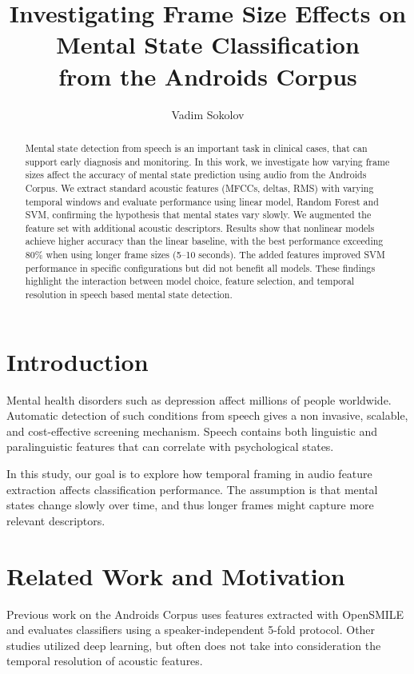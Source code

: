 \documentclass[conference]{IEEEtran}
\begin{document}
\title{\textbf{Investigating Frame Size Effects on Mental State Classification\\ from the Androids Corpus}}


\author{Vadim Sokolov}
\date{}

\maketitle

\begin{abstract}
Mental state detection from speech is an important task in clinical cases, that can support early diagnosis and monitoring. 
In this work, we investigate how varying frame sizes affect the accuracy of mental state prediction using audio from the Androids Corpus. 
We extract standard acoustic features (MFCCs, deltas, RMS) with varying temporal windows and evaluate performance using linear model, Random Forest and SVM, confirming the hypothesis that mental states vary slowly. 
We augmented the feature set with additional acoustic descriptors. 
Results show that nonlinear models achieve higher accuracy than the linear baseline, with the best performance exceeding 80\% when using longer frame sizes (5–10 seconds). 
The added features improved SVM performance in specific configurations but did not benefit all models. 
These findings highlight the interaction between model choice, feature selection, and temporal resolution in speech based mental state detection.

\end{abstract}

\section{Introduction}
Mental health disorders such as depression affect millions of people worldwide. 
Automatic detection of such conditions from speech gives a non invasive, scalable, and cost-effective screening mechanism. 
Speech contains both linguistic and paralinguistic features that can correlate with psychological states.

In this study, our goal is to explore how temporal framing in audio feature extraction affects classification performance. 
The assumption is that mental states change slowly over time, and thus longer frames might capture more relevant descriptors.

\section{Related Work and Motivation}
Previous work on the Androids Corpus \cite{androids2021} uses features extracted with OpenSMILE and evaluates classifiers using a speaker-independent 5-fold protocol. 
Other studies utilized deep learning, but often does not take into consideration the temporal resolution of acoustic features.
\end{document}
